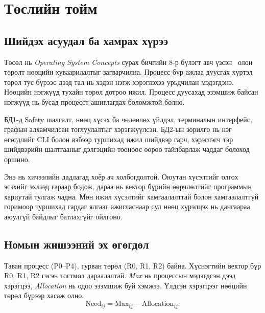 \section{Төслийн тойм}
\subsection{Шийдэх асуудал ба хамрах хүрээ}
Төсөл нь \textit{Operating System Concepts} сурах бичгийн 8-р бүлэгт авч үзсэн~\cite{osc} олон төрөлт нөөцийн хуваарилалтыг загварчилна. Процесс бүр ажлаа дуусгах хүртэл төрөл тус бүрээс дээд тал нь хэдэн нэгж хэрэглэхээ урьдчилан мэдэгдэнэ. Нөөцийн нэгжүүд тухайн төрөл дотроо ижил. Процесс дуусахад эзэмшиж байсан нэгжүүд нь бусад процесст ашиглагдах боломжтой болно.

БД1-д Safety шалгалт, нөөц хүсэх ба чөлөөлөх үйлдэл, терминалын интерфейс, графын алхамчилсан тоглуулалтыг хэрэгжүүлсэн. БД2-ын зорилго нь нэг өгөгдлийг CLI болон вэбээр туршихад ижил шийдвэр гарч, хэрэглэгч тэр шийдвэрийн шалтгааныг дэлгэцийн тооноос өөрөө тайлбарлаж чаддаг болоход оршино.

Энэ нь хичээлийн дадлагад хоёр ач холбогдолтой. Оюутан хүсэлтийг олгох эсэхийг эхлээд гараар бодож, дараа нь вектор бүрийн өөрчлөлтийг программын хариутай тулгаж чадна. Мөн ижил хүсэлтийг хамгаалалттай болон хамгаалалтгүй горимоор туршихад гардаг ялгааг ажигласнаар сул нөөц хүрэлцэх нь дангаараа аюулгүй байдлыг батлахгүйг ойлгоно.

\subsection{Номын жишээний эх өгөгдөл}
Таван процесс (P0–P4), гурван төрөл (R0, R1, R2) байна. Хүснэгтийн вектор бүр R0, R1, R2 гэсэн тогтмол дараалалтай. \textit{Max} нь процессын мэдэгдсэн дээд хэрэгцээ, \textit{Allocation} нь одоо эзэмшиж буй хэмжээ. Үлдсэн хэрэгцээг нөөцийн төрөл бүрээр хасаж олно.
\[
 \mathrm{Need}_{ij}=\mathrm{Max}_{ij}-\mathrm{Allocation}_{ij}.
\]

